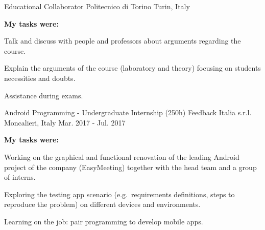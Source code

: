 {\begin{cventries}
  \cventry
    {Educational Collaborator} %
    {Politecnico di Torino} %
    {Turin, Italy} %
    {} %
    {
      \begin{cvsubentries}
      \end{cvsubentries}
      \begin{cvparagraph}
        \vspace{-3mm}
        {\textbf{My tasks were:}}
      \end{cvparagraph}
      \begin{cvitems} %
        \item {Talk and discuss with people and professors about arguments regarding the course.}
        \item {Explain the arguments of the course (laboratory and theory) focusing on students necessities and doubts.}
        \item {Assistance during exams.}
      \end{cvitems}
    }

  \cventry
    {Android Programming - Undergraduate Internship (250h)} %
    {Feedback Italia s.r.l.} %
    {Moncalieri, Italy} %
    {Mar. 2017 - Jul. 2017} %
    {
      \begin{cvparagraph}
        {\textbf{My tasks were:}}
      \end{cvparagraph}
      \begin{cvitems} %
        \item {Working on the graphical and functional renovation of the leading Android project of the company (EasyMeeting) together with the head team and a group of interns.}
        \item {Exploring the testing app scenario (e.g.\ requirements definitions, steps to reproduce the problem) on different devices and environments.}
        \item {Learning on the job: pair programming to develop mobile apps.}
      \end{cvitems}
    }


\end{cventries}}
